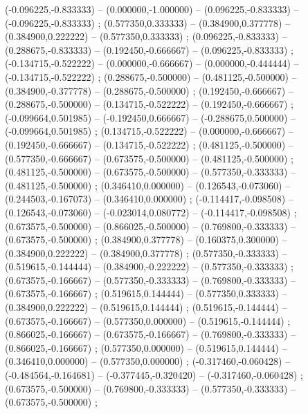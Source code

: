    (-0.096225,-0.833333) -- (0.000000,-1.000000) -- (0.096225,-0.833333) -- (-0.096225,-0.833333) ;
   (0.577350,0.333333) -- (0.384900,0.377778) -- (0.384900,0.222222) -- (0.577350,0.333333) ;
   (0.096225,-0.833333) -- (0.288675,-0.833333) -- (0.192450,-0.666667) -- (0.096225,-0.833333) ;
   (-0.134715,-0.522222) -- (0.000000,-0.666667) -- (0.000000,-0.444444) -- (-0.134715,-0.522222) ;
   (0.288675,-0.500000) -- (0.481125,-0.500000) -- (0.384900,-0.377778) -- (0.288675,-0.500000) ;
   (0.192450,-0.666667) -- (0.288675,-0.500000) -- (0.134715,-0.522222) -- (0.192450,-0.666667) ;
   (-0.099664,0.501985) -- (-0.192450,0.666667) -- (-0.288675,0.500000) -- (-0.099664,0.501985) ;
   (0.134715,-0.522222) -- (0.000000,-0.666667) -- (0.192450,-0.666667) -- (0.134715,-0.522222) ;
   (0.481125,-0.500000) -- (0.577350,-0.666667) -- (0.673575,-0.500000) -- (0.481125,-0.500000) ;
   (0.481125,-0.500000) -- (0.673575,-0.500000) -- (0.577350,-0.333333) -- (0.481125,-0.500000) ;
   (0.346410,0.000000) -- (0.126543,-0.073060) -- (0.244503,-0.167073) -- (0.346410,0.000000) ;
   (-0.114417,-0.098508) -- (0.126543,-0.073060) -- (-0.023014,0.080772) -- (-0.114417,-0.098508) ;
   (0.673575,-0.500000) -- (0.866025,-0.500000) -- (0.769800,-0.333333) -- (0.673575,-0.500000) ;
   (0.384900,0.377778) -- (0.160375,0.300000) -- (0.384900,0.222222) -- (0.384900,0.377778) ;
   (0.577350,-0.333333) -- (0.519615,-0.144444) -- (0.384900,-0.222222) -- (0.577350,-0.333333) ;
   (0.673575,-0.166667) -- (0.577350,-0.333333) -- (0.769800,-0.333333) -- (0.673575,-0.166667) ;
   (0.519615,0.144444) -- (0.577350,0.333333) -- (0.384900,0.222222) -- (0.519615,0.144444) ;
   (0.519615,-0.144444) -- (0.673575,-0.166667) -- (0.577350,0.000000) -- (0.519615,-0.144444) ;
   (0.866025,-0.166667) -- (0.673575,-0.166667) -- (0.769800,-0.333333) -- (0.866025,-0.166667) ;
   (0.577350,0.000000) -- (0.519615,0.144444) -- (0.346410,0.000000) -- (0.577350,0.000000) ;
   (-0.317460,-0.060428) -- (-0.484564,-0.164681) -- (-0.377445,-0.320420) -- (-0.317460,-0.060428) ;
   (0.673575,-0.500000) -- (0.769800,-0.333333) -- (0.577350,-0.333333) -- (0.673575,-0.500000) ;
